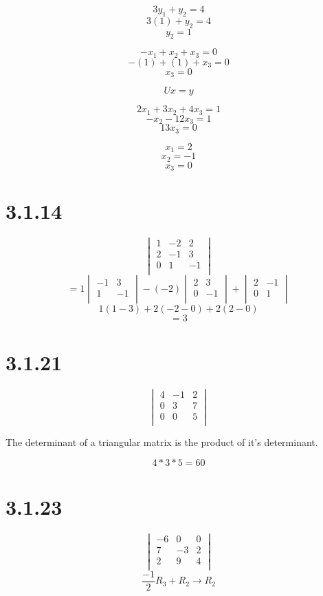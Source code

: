 \documentclass[journal]{IEEEtran}
\begin{document}
{			\[3y_1 + y_2 = 4\]
			\[3(1) + y_2 = 4\]
			\[y_2 = 1\]

			\[-x_1 + x_2 + x_3 = 0\]
			\[-(1) + (1) + x_3 = 0\]
			\[x_3 = 0\]

			\[Ux = y\]

			\[2x_1 + 3x_2 + 4x_3 = 1\]
			\[-x_2 -12x_3 = 1\]
			\[13x_3 = 0\]

			\[x_1 = 2\]
			\[x_2 = -1\]
			\[x_3 = 0\]

		\newpage
		\section*{\Large{\textbf{3.1.14}}}
			\[
				\begin{vmatrix}
					1&	-2& 2	\\
					2&	-1& 3	\\
					0&	1&  -1	\\
				\end{vmatrix}
			\]
			\[
				=1\begin{vmatrix}
					-1& 3	\\
					1&  -1	\\
				\end{vmatrix}-(-2)
				\begin{vmatrix}
					2&	3	\\
					0&	-1	\\
				\end{vmatrix}+
				\begin{vmatrix}
					2&	-1	\\
					0&	1	\\
				\end{vmatrix}
			\]
			\[
				1(1-3)+2(-2-0)+2(2-0)
			\]
			\[
				=3
			\]
		\section*{\Large{\textbf{3.1.21}}}
			\[
				\begin{vmatrix}
					4&	-1&	2 \\
					0&	3&	7 \\
					0&	0&	5 \\
				\end{vmatrix}
			\]

			The determinant of a triangular matrix is the product of it's determinant.

			\[
				4*3*5 = 60
			\]

		\section*{\Large{\textbf{3.1.23}}}
			\[
				\begin{vmatrix}
					-6&	0&	0 \\
					7&	-3&	2 \\
					2&	9&	4 \\
				\end{vmatrix}
			\]
			\[\frac{-1}{2}R_3+ R_2 \rightarrow R_2\]

}
\end{document}
